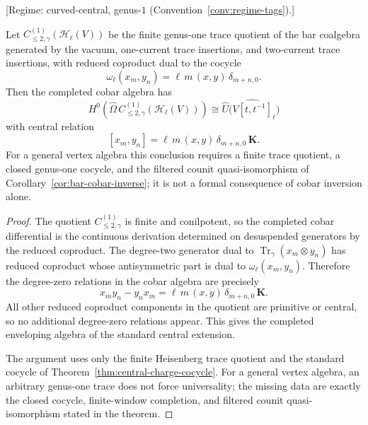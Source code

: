 \begin{theorem}\label{thm:genus1-cobar-bar}
\textup{[Regime: curved-central, genus-$1$
\textup{(}Convention~\textup{\ref{conv:regime-tags})}.]}

Let $C_{\le2,\gamma}^{(1)}(\mathcal H_\ell(V))$ be the finite
genus-one trace quotient of the bar coalgebra generated by the vacuum,
one-current trace insertions, and two-current trace insertions, with
reduced coproduct dual to the cocycle
\[
\omega_\ell(x_m,y_n)=\ell\,m\,(x,y)\,\delta_{m+n,0}.
\]
Then the completed cobar algebra has
\[
H^0\!\left(\widehat{\Omega}\,
C_{\le2,\gamma}^{(1)}(\mathcal H_\ell(V))\right)
\cong
\widehat U\bigl(\widehat{V[t,t^{-1}]}_\ell\bigr)
\]
with central relation
\[
[x_m,y_n]=\ell\,m\,(x,y)\,\delta_{m+n,0}\,\mathbf K.
\]
For a general vertex algebra this conclusion requires a finite trace
quotient, a closed genus-one cocycle, and the filtered counit
quasi-isomorphism of Corollary~\ref{cor:bar-cobar-inverse}; it is not a
formal consequence of cobar inversion alone.
\end{theorem}

\begin{proof}
The quotient $C_{\le2,\gamma}^{(1)}$ is finite and conilpotent, so the
completed cobar differential is the continuous derivation determined on
desuspended generators by the reduced coproduct. The degree-two
generator dual to
$\operatorname{Tr}_\gamma(x_m\otimes y_n)$ has reduced coproduct whose
antisymmetric part is dual to
$\omega_\ell(x_m,y_n)$. Therefore the degree-zero relations in the
cobar algebra are precisely
\[
x_my_n-y_nx_m
  =\ell\,m\,(x,y)\,\delta_{m+n,0}\,\mathbf K.
\]
All other reduced coproduct components in the quotient are primitive or
central, so no additional degree-zero relations appear. This gives the
completed enveloping algebra of the standard central extension.

The argument uses only the finite Heisenberg trace quotient and the
standard cocycle of Theorem~\ref{thm:central-charge-cocycle}. For a
general vertex algebra, an arbitrary genus-one trace does not force
universality; the missing data are exactly the closed cocycle,
finite-window completion, and filtered counit quasi-isomorphism stated
in the theorem.
\end{proof}

